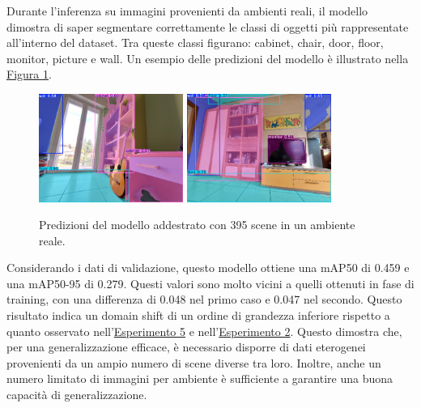 \documentclass[12pt]{report}
\begin{document}
Durante l'inferenza su immagini provenienti da ambienti reali, il modello dimostra di saper segmentare correttamente le classi di oggetti più rappresentate all'interno del dataset. Tra queste classi figurano: cabinet, chair, door, floor, monitor, picture e wall. Un esempio delle predizioni del modello è illustrato nella \hyperref[fig:prediciton-3]{Figura \ref{fig:prediciton-3}}.

\begin{figure}[h!]
	\centering
	{\includegraphics[width=0.42\textwidth]{images/domain-shift/real-to-real/3/prediction-1.jpg}}
	\hspace{0.01\textwidth}
	{\includegraphics[width=0.42\textwidth]{images/domain-shift/real-to-real/3/prediction-2.jpg}}
	\hspace{0.01\textwidth}
	\caption{Predizioni del modello addestrato con 395 scene in un ambiente reale.}
	\label{fig:prediciton-3}
\end{figure}

Considerando i dati di validazione, questo modello ottiene una mAP50 di 0.459 e una mAP50-95 di 0.279. Questi valori sono molto vicini a quelli ottenuti in fase di training, con una differenza di 0.048 nel primo caso e 0.047 nel secondo. Questo risultato indica un domain shift di un ordine di grandezza inferiore rispetto a quanto osservato nell'\hyperref[sec:esperimento_5]{Esperimento 5} e nell'\hyperref[sec:esperimento_2]{Esperimento 2}. Questo dimostra che, per una generalizzazione efficace, è necessario disporre di dati eterogenei provenienti da un ampio numero di scene diverse tra loro. Inoltre, anche un numero limitato di immagini per ambiente è sufficiente a garantire una buona capacità di generalizzazione.
\end{document}
